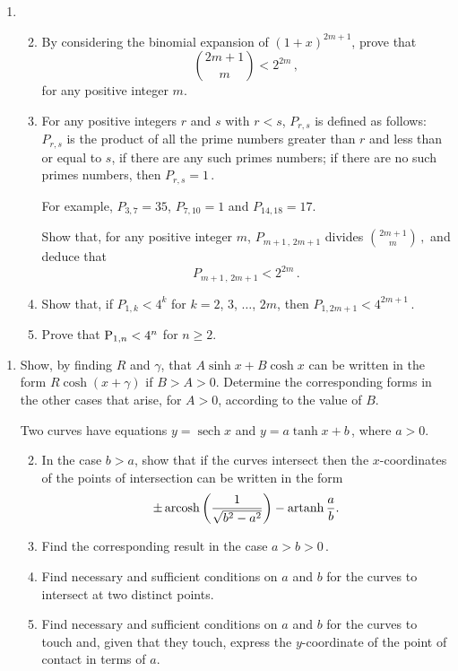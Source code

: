 \documentclass[a4, 11pt]{report}
\newlength{\qspace}
\newcounter{qnumber}
\newenvironment{question}%
 {\vspace{\qspace}
  \begin{enumerate}[\bfseries 1\quad][10]%
    \setcounter{enumi}{\value{qnumber}}%
    \item%
 }
{
  \end{enumerate}
  \filbreak
  \stepcounter{qnumber}
 }
\newenvironment{questionparts}[1][1]%
 {
  \begin{enumerate}[\bfseries (i)]%
    \setcounter{enumii}{#1}
    \addtocounter{enumii}{-1}
    \setlength{\itemsep}{5mm}
    \setlength{\parskip}{8pt}
 }
 {
  \end{enumerate}
 }
\DeclareMathOperator{\arcosh}{arcosh}
\DeclareMathOperator{\sech}{sech}
\def\P{{\rm P}}
\def\ge{\geqslant}
\begin{document}
\begin{question}
\begin{questionparts}
\item By considering the binomial expansion of $(1+x)^{2m+1}$,
 prove that 
\[
\binom{ 2m \! +\!  1}{ m} < 2^{2m}\,,
\]
for any positive integer $m$.

\item
For any positive integers $r$ and  $s$ with $r<s$, 
$P_{r,s}$ is defined as follows:
$P_{r,s}$ is 
the product of all the prime numbers greater than  $r$ 
and less than or
equal to $s$, if there are any such primes numbers; 
if there are no such primes numbers,
then $P_{r,s}=1\,$.

For example, $P_{3,7}=35$, $P_{7,10}=1$ and $P_{14,18}=17$.
 
Show that, for any positive integer $m$,
$
P_{m+1\,,\, 2m+1} 
$    
divides 
$\displaystyle \binom{ 2m \! +\!  1}{ m} \,,$
and deduce that
\[
P_{m+1\,,\, 2m+1} < 2^{2m}
\,.
\]

\item  Show that, if $P_{1,k} < 4^k$ for $k = 2$, $3$,  $\ldots$, $2m$,
then  
$ P_{1,2m+1} < 4^{2m+1}\,$.

\item
Prove that $\P_{1,n}  < 4^n$ for 
 $n\ge2$.
\end{questionparts}

\end{question} 
\begin{question}
Show, by finding $R$ and $\gamma$, that 
$A \sinh x + B\cosh x $ can be written in the 
form $R\cosh (x+\gamma)$ if $B>A>0$. Determine the corresponding forms
in the other cases that arise, for $A>0$, according to the value of $B$. 

Two curves have equations  
$y = \sech x$  
and $y = a\tanh x + b\,$, where $a>0$.
\begin{questionparts}
\item
In the case $b>a$, show that if the curves intersect then the $x$-coordinates
of the points of intersection can be written in the form
\[
\pm\arcosh \left( \frac 1 {\sqrt{b^2-a^2}}\right) - {\rm artanh \,} \frac a b
.\]

\item 
Find the corresponding result 
in the case $a>b>0\,$. 

\item Find necessary and sufficient conditions on $a$ and $b$ for  the curves to intersect
at two distinct points.
\item Find necessary and sufficient conditions on $a$ and $b$ for  the curves to touch
 and, given that they touch, 
 express the $y$-coordinate of the point of contact 
 in terms of $a$.

\end{questionparts}
\end{question}
\end{document}
